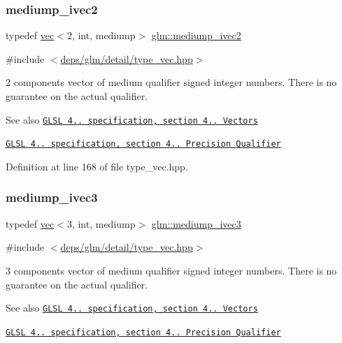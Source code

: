 \subsubsection{\texorpdfstring{mediump\+\_\+ivec2}{mediump\_ivec2}}
{\footnotesize\ttfamily typedef \hyperlink{structglm_1_1vec}{vec}$<$2, int, mediump$>$ \hyperlink{group__core__precision_ga0efcfa6750f1c7197ff1c3390521ffd7}{glm\+::mediump\+\_\+ivec2}}



{\ttfamily \#include $<$\hyperlink{type__vec_8hpp}{deps/glm/detail/type\+\_\+vec.\+hpp}$>$}

2 components vector of medium qualifier signed integer numbers. There is no guarantee on the actual qualifier.

\begin{DoxySeeAlso}{See also}
\href{http://www.opengl.org/registry/doc/GLSLangSpec.4.20.8.pdf}{\tt G\+L\+SL 4.. specification, section 4.. Vectors} 

\href{http://www.opengl.org/registry/doc/GLSLangSpec.4.20.8.pdf}{\tt G\+L\+SL 4.. specification, section 4.. Precision Qualifier} 
\end{DoxySeeAlso}


Definition at line 168 of file type\+\_\+vec.\+hpp.

\mbox{\label{group__core__precision_ga33f150e1d55aa6c91927cb0431bf0708}} 
\subsubsection{\texorpdfstring{mediump\+\_\+ivec3}{mediump\_ivec3}}
{\footnotesize\ttfamily typedef \hyperlink{structglm_1_1vec}{vec}$<$3, int, mediump$>$ \hyperlink{group__core__precision_ga33f150e1d55aa6c91927cb0431bf0708}{glm\+::mediump\+\_\+ivec3}}



{\ttfamily \#include $<$\hyperlink{type__vec_8hpp}{deps/glm/detail/type\+\_\+vec.\+hpp}$>$}

3 components vector of medium qualifier signed integer numbers. There is no guarantee on the actual qualifier.

\begin{DoxySeeAlso}{See also}
\href{http://www.opengl.org/registry/doc/GLSLangSpec.4.20.8.pdf}{\tt G\+L\+SL 4.. specification, section 4.. Vectors} 

\href{http://www.opengl.org/registry/doc/GLSLangSpec.4.20.8.pdf}{\tt G\+L\+SL 4.. specification, section 4.. Precision Qualifier} 
\end{DoxySeeAlso}


